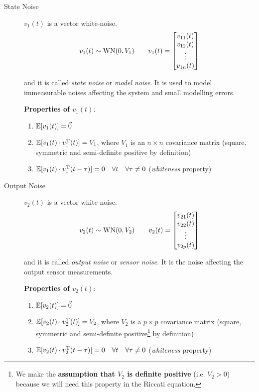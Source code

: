 \begin{description}
    
    \vspace{15pt}
    
    \item [State Noise] $v_1(t)$ is a vector white-noise.
    \[
        v_1(t) \sim \operatorname{WN}(0, V_1) \qquad v_1(t) = \begin{bmatrix}
            v_{11}(t) \\
            v_{12}(t) \\
            \vdots \\
            v_{1n}(t)
        \end{bmatrix}
    \]
    
    and it is called \emph{state noise} or \emph{model noise}.
    It is used to model immeasurable noises affecting the system and small modelling errors.
    
    \textbf{Properties of $v_1(t)$}:
    \begin{enumerate}
        \item $\mathbb{E}[v_1(t)] = \vec{0}$
        \item $\mathbb{E}[v_1(t) \cdot v_1^{\mathrm{T}}(t)] = V_1$, where $V_1$ is an $n\times n$ covariance matrix (square, symmetric and semi-definite positive by definition)
        \item $\mathbb{E}[v_1(t) \cdot v_1^{\mathrm{T}}(t-\tau)] = 0 \quad \forall t \quad \forall \tau \ne 0$ (\emph{whiteness} property)
    \end{enumerate}
    
    \vspace{15pt}
    
    \item [Output Noise] $v_2(t)$ is a vector white-noise.
    \[
        v_2(t) \sim \operatorname{WN}(0, V_2) \qquad v_2(t) = \begin{bmatrix}
            v_{21}(t) \\
            v_{22}(t) \\
            \vdots \\
            v_{2p}(t)
        \end{bmatrix}
    \]
    
    and it is called \emph{output noise} or \emph{sensor noise}. It is the noise affecting the output sensor measurements.
    
    \textbf{Properties of $v_2(t)$}:
    \begin{enumerate}
        \item $\mathbb{E}[v_2(t)] = \vec{0}$
        \item $\mathbb{E}[v_2(t) \cdot v_2^{\mathrm{T}}(t)] = V_2$, where $V_2$ is a $p\times p$ covariance matrix (square, symmetric and semi-definite positive\footnote{We make the \textbf{assumption that $V_2$ is definite positive} (i.e. $V_2>0$) because we will need this property in the Riccati equation.} by definition)
        \item $\mathbb{E}[v_2(t) \cdot v_2^{\mathrm{T}}(t-\tau)] = 0 \quad \forall t \quad \forall \tau \ne 0$ (\emph{whiteness} property)
    \end{enumerate}

\end{description}

